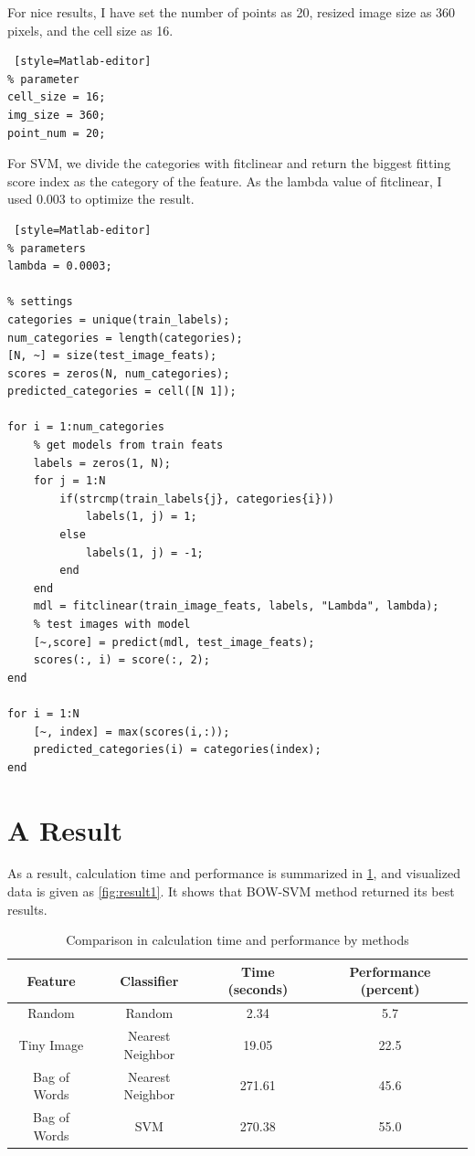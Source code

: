 For nice results, I have set the number of points as 20, resized image size as 360 pixels, and the cell size as 16. 

\begin{lstlisting} [style=Matlab-editor]
% parameter
cell_size = 16;
img_size = 360;
point_num = 20;
\end{lstlisting}

For SVM, we divide the categories with fitclinear and return the biggest fitting score index as the category of the feature. As the lambda value of fitclinear, I used 0.003 to optimize the result.

\begin{lstlisting} [style=Matlab-editor]
% parameters
lambda = 0.0003;

% settings
categories = unique(train_labels);
num_categories = length(categories);
[N, ~] = size(test_image_feats);
scores = zeros(N, num_categories);
predicted_categories = cell([N 1]);

for i = 1:num_categories
    % get models from train feats
    labels = zeros(1, N);
    for j = 1:N
        if(strcmp(train_labels{j}, categories{i}))
            labels(1, j) = 1;
        else
            labels(1, j) = -1;
        end
    end
    mdl = fitclinear(train_image_feats, labels, "Lambda", lambda);
    % test images with model
    [~,score] = predict(mdl, test_image_feats);
    scores(:, i) = score(:, 2);
end

for i = 1:N
    [~, index] = max(scores(i,:));
    predicted_categories(i) = categories(index);
end
\end{lstlisting}

\section*{A Result}

As a result, calculation time and performance is summarized in \ref{tab:table1}, and visualized data is given as \ref{fig:result1}. It shows that BOW-SVM method returned its best results. 

\begin{table}[h]
    \centering
    \begin{tabular}{||c c c c||}
        \toprule
        Feature & Classifier & Time (seconds) & Performance (percent)\\ [0.5ex]
        \midrule
        Random & Random & 2.34 & 5.7 \\ [0.5ex]
        Tiny Image & Nearest Neighbor & 19.05 & 22.5\\ [0.5ex]
        Bag of Words & Nearest Neighbor & 271.61 & 45.6\\ [0.5ex]
        Bag of Words & SVM & 270.38 & 55.0\\ [0.5ex]
        \bottomrule
    \end{tabular}
    \caption{Comparison in calculation time and performance by methods}
    \label{tab:table1}
\end{table}


